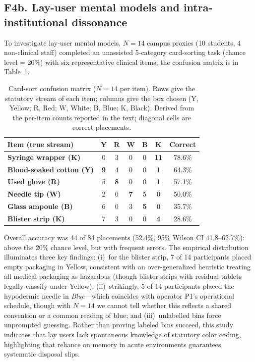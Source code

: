 \documentclass[10pt,twocolumn,a4paper]{article}
\newcommand{\tabref}[1]{Table~\ref{#1}}
\begin{document}
\subsection{F4b. Lay-user mental models and intra-institutional dissonance}
To investigate lay-user mental models, $N=14$ campus proxies (10 students, 4 non-clinical staff) completed an unassisted 5-category card-sorting task (chance level = 20\%) with six representative clinical items; the confusion matrix is in \tabref{tab:cards}.
\begin{table}[!t]
\centering\footnotesize
\caption{Card-sort confusion matrix ($N=14$ per item). Rows give the statutory stream of each item; columns give the box chosen (Y, Yellow; R, Red; W, White; B, Blue; K, Black). Derived from the per-item counts reported in the text; diagonal cells are correct placements.}\label{tab:cards}
\begin{tabularx}{\columnwidth}{@{}>{\bfseries}l c c c c c c@{}}
\toprule
Item (true stream) & Y & R & W & B & K & Correct\\\midrule
Syringe wrapper (K) & 0 & 3 & 0 & 0 & \textbf{11} & 78.6\%\\
Blood-soaked cotton (Y) & \textbf{9} & 4 & 0 & 0 & 1 & 64.3\%\\
Used glove (R) & 5 & \textbf{8} & 0 & 0 & 1 & 57.1\%\\
Needle tip (W) & 2 & 0 & \textbf{7} & 5 & 0 & 50.0\%\\
Glass ampoule (B) & 6 & 0 & 3 & \textbf{5} & 0 & 35.7\%\\
Blister strip (K) & 7 & 3 & 0 & 0 & \textbf{4} & 28.6\%\\
\bottomrule
\end{tabularx}
\end{table}
Overall accuracy was 44 of 84 placements (52.4\%, 95\% Wilson CI 41.8--62.7\%): above the 20\% chance level, but with frequent errors. The empirical distribution illuminates three key findings: (i)~for the blister strip, 7 of 14 participants placed empty packaging in Yellow, consistent with an over-generalized heuristic treating all medical packaging as hazardous (though blister strips with residual tablets legally classify under Yellow); (ii)~strikingly, 5 of 14 participants placed the hypodermic needle in \emph{Blue}---which coincides with operator P1's operational schedule, though with $N=14$ we cannot tell whether this reflects a shared convention or a common reading of blue; and (iii)~unlabelled bins force unprompted guessing. Rather than proving labeled bins succeed, this study indicates that lay users lack spontaneous knowledge of statutory color coding, highlighting that reliance on memory in acute environments guarantees systematic disposal slips.
\end{document}
